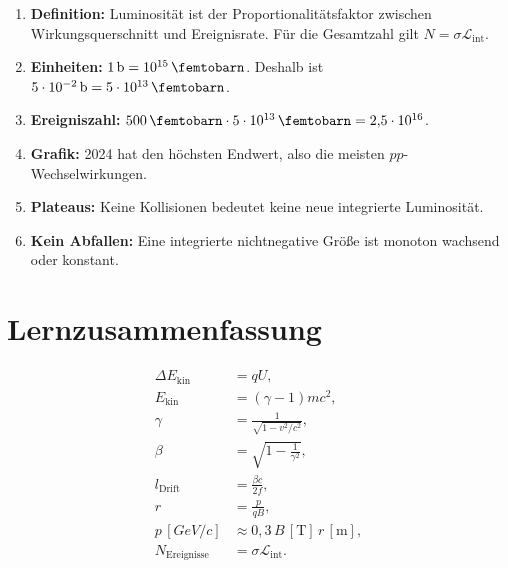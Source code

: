 \documentclass[11pt,a4paper]{scrartcl}
\newcommand{\GeV}{\si{GeV}}
\newcommand{\lum}{\mathcal{L}}
\theoremstyle{definition}
\theoremstyle{plain}
\theoremstyle{remark}
\begin{document}
\begin{presentationbox}
\begin{enumerate}[label=\arabic*.]
    \item \textbf{Definition:} Luminosität ist der Proportionalitätsfaktor zwischen Wirkungsquerschnitt und Ereignisrate. Für die Gesamtzahl gilt \(N=\sigma\lum_{\mathrm{int}}\).
    \item \textbf{Einheiten:} \(1\,\si{\barn}=10^{15}\,\si{\femtobarn}\). Deshalb ist \(5\cdot10^{-2}\,\si{\barn}=5\cdot10^{13}\,\si{\femtobarn}\).
    \item \textbf{Ereigniszahl:} \(500\,\si{\per\femtobarn}\cdot5\cdot10^{13}\,\si{\femtobarn}=2{,}5\cdot10^{16}\).
    \item \textbf{Grafik:} 2024 hat den höchsten Endwert, also die meisten \(pp\)-Wechselwirkungen.
    \item \textbf{Plateaus:} Keine Kollisionen bedeutet keine neue integrierte Luminosität.
    \item \textbf{Kein Abfallen:} Eine integrierte nichtnegative Größe ist monoton wachsend oder konstant.
\end{enumerate}
\end{presentationbox}

\FloatBarrier
\newpage

\section{Lernzusammenfassung}

\begin{summarybox}[title=Zentrale Formeln]
\begin{align*}
    \Delta E_{\mathrm{kin}} &= qU,\\
    E_{\mathrm{kin}} &= (\gamma-1)mc^2,\\
    \gamma &= \frac{1}{\sqrt{1-v^2/c^2}},\\
    \beta &= \sqrt{1-\frac{1}{\gamma^2}},\\
    l_{\mathrm{Drift}} &= \frac{\beta c}{2f},\\
    r &= \frac{p}{qB},\\
    p\,[\si{\GeV}/c] &\approx 0{,}3\,B\,[\si{\tesla}]\,r\,[\si{\metre}],\\
    N_{\mathrm{Ereignisse}} &= \sigma\lum_{\mathrm{int}}.
\end{align*}
\end{summarybox}
\end{document}
